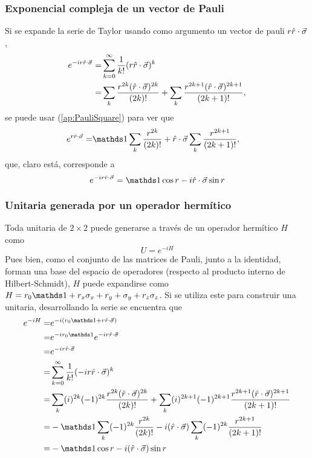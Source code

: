 \subsubsection{Exponencial compleja de un vector de Pauli}
Si se expande la serie de Taylor usando como argumento un vector de pauli $r\hat{r}\cdot\vec{\sigma}$,
\begin{align*}
    e^{-ir\hat{r}\cdot\vec{\sigma}}=&\sum_{k=0}^{\infty}\frac{1}{k!}(r\hat{r}\cdot\vec{\sigma})^k\\
    =&\sum_{k}\frac{r^{2k}(\hat{r}\cdot\vec{\sigma})^{2k}}{(2k)!}+\sum_{k}\frac{r^{2k+1}(\hat{r}\cdot\vec{\sigma})^{2k+1}}{(2k+1)!},
\end{align*}
se puede usar (\ref{ap:PauliSquare}) para ver que
\begin{align*}
    e^{r\paulivec{r}}=&\Id\sum_{k}\frac{r^{2k}}{(2k)!}+\paulivec{r}\sum_{k}\frac{r^{2k+1}}{(2k+1)!},
\end{align*}
que, claro está, corresponde a
\begin{equation}\label{ap:PauliCompExp}
    e^{-ir\paulivec{r}}=\Id\cos{r}-i\paulivec{r}\sin{r}
\end{equation}
\subsubsection{Unitaria generada por un operador hermítico}
Toda unitaria de $2\times 2$ puede generarse a través de un operador hermítico $H$ como
\begin{equation*}
    U=e^{-iH}
\end{equation*}
Pues bien, como el conjunto de las matrices de Pauli, junto a la identidad, forman una base del espacio de operadores (respecto al producto interno de Hilbert-Schmidt), $H$ puede expandirse como $H=r_{0}\Id+r_{x}\pauli{x}+r_{y}+\pauli{y}+r_{z}\pauli{z}$. Si se utiliza este para construir una unitaria, desarrollando la serie se encuentra que
\begin{align*}
    e^{-iH}=&e^{-i(r_{0}\Id+r\paulivec{r})}\\
    =&e^{-i r_{0}\Id}e^{-ir\paulivec{r}}\\
    =&e^{-ir\paulivec{r}}\\
    =&\sum_{k=0}^{\infty}\frac{1}{k!}(-ir\paulivec{r})^k\\
    =&\sum_{k}(i)^{2k}(-1)^{2k}\frac{r^{2k}(\paulivec{r})^{2k}}{(2k)!}+\sum_{k}(i)^{2k+1}(-1)^{2k+1}\frac{r^{2k+1}(\paulivec{r})^{2k+1}}{(2k+1)!}\\
    =&-\Id\sum_{k}(-1)^{2k}\frac{r^{2k}}{(2k)!}-i(\paulivec{r})\sum_{k}(-1)^{2k}\frac{r^{2k+1}}{(2k+1)!}\\
    =&-\Id \cos{r}-i(\paulivec{r})\sin{r}
\end{align*}
